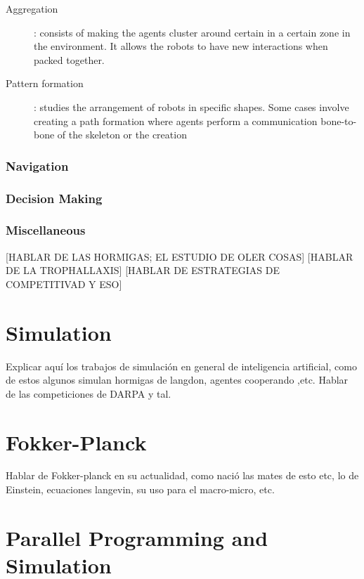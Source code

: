 \begin{description}
\item[Aggregation]: consists of making the agents cluster around certain in a certain zone in the environment. It allows the robots to have new interactions when packed together.

\item[Pattern formation]: studies the arrangement of robots in specific shapes. Some cases involve creating a path formation where agents perform a communication bone-to-bone of the skeleton or the creation 


\end{description}

\subsubsection{Navigation}
\subsubsection{Decision Making}
\subsubsection{Miscellaneous}
[HABLAR DE LAS HORMIGAS; EL ESTUDIO DE OLER COSAS]
[HABLAR DE LA TROPHALLAXIS]
[HABLAR DE ESTRATEGIAS DE COMPETITIVAD Y ESO]


\section{Simulation}
Explicar aquí los trabajos de simulación en general de inteligencia artificial, como de estos algunos simulan hormigas de langdon, agentes cooperando ,etc. Hablar de las competiciones de DARPA y tal.

\section{Fokker-Planck}
Hablar de Fokker-planck en su actualidad, como nació las mates de esto etc, lo de Einstein, ecuaciones langevin, su uso para el macro-micro, etc.

\section{Parallel Programming and Simulation}